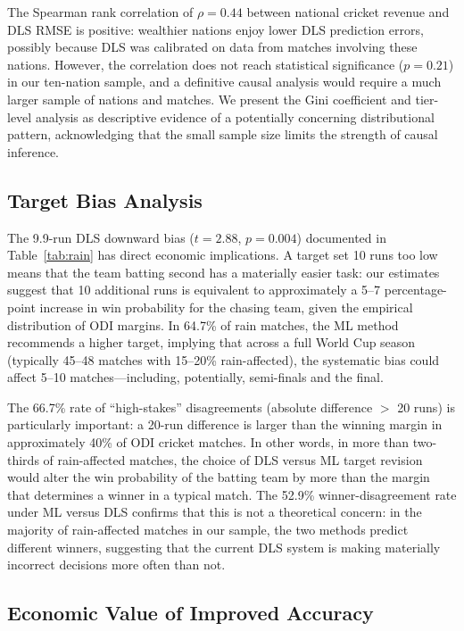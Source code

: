\documentclass[10pt,a4paper,twocolumn]{article}
\begin{document}
The Spearman rank correlation of $\rho = 0.44$ between national cricket revenue and DLS RMSE is positive: wealthier nations enjoy lower DLS prediction errors, possibly because DLS was calibrated on data from matches involving these nations. However, the correlation does not reach statistical significance ($p = 0.21$) in our ten-nation sample, and a definitive causal analysis would require a much larger sample of nations and matches. We present the Gini coefficient and tier-level analysis as descriptive evidence of a potentially concerning distributional pattern, acknowledging that the small sample size limits the strength of causal inference.

\subsection{Target Bias Analysis}

The 9.9-run DLS downward bias ($t = 2.88$, $p = 0.004$) documented in Table~\ref{tab:rain} has direct economic implications. A target set 10 runs too low means that the team batting second has a materially easier task: our estimates suggest that 10 additional runs is equivalent to approximately a 5--7 percentage-point increase in win probability for the chasing team, given the empirical distribution of ODI margins. In 64.7\% of rain matches, the ML method recommends a higher target, implying that across a full World Cup season (typically 45--48 matches with 15--20\% rain-affected), the systematic bias could affect 5--10 matches---including, potentially, semi-finals and the final.

The 66.7\% rate of ``high-stakes'' disagreements (absolute difference $>$ 20 runs) is particularly important: a 20-run difference is larger than the winning margin in approximately 40\% of ODI cricket matches. In other words, in more than two-thirds of rain-affected matches, the choice of DLS versus ML target revision would alter the win probability of the batting team by more than the margin that determines a winner in a typical match. The 52.9\% winner-disagreement rate under ML versus DLS confirms that this is not a theoretical concern: in the majority of rain-affected matches in our sample, the two methods predict different winners, suggesting that the current DLS system is making materially incorrect decisions more often than not.

\subsection{Economic Value of Improved Accuracy}
\end{document}
